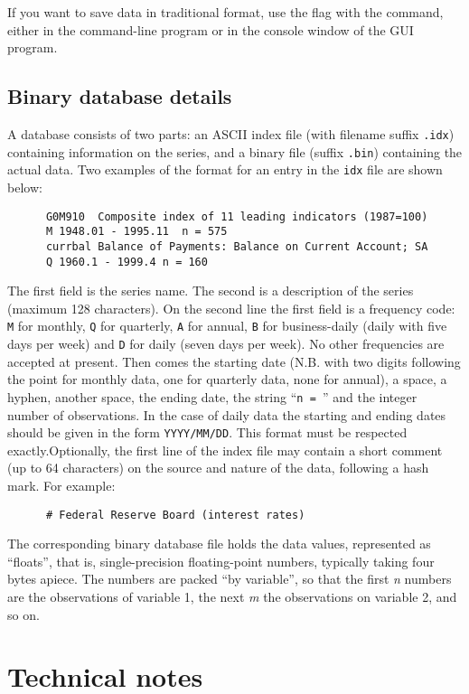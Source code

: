 If you want to save data in traditional format, use the  flag
with the  command, either in the command-line program or in
the console window of the GUI program.

\section{Binary database details}
\label{dbdetails}

A  database consists of two parts: an ASCII index file
(with filename suffix \verb+.idx+) containing information on the
series, and a binary file (suffix \verb+.bin+) containing the actual
data.  Two examples of the format for an entry in the \verb+idx+ file
are shown below:
\begin{verbatim}
      G0M910  Composite index of 11 leading indicators (1987=100) 
      M 1948.01 - 1995.11  n = 575
      currbal Balance of Payments: Balance on Current Account; SA 
      Q 1960.1 - 1999.4 n = 160
\end{verbatim}
The first field is the series name.  The second is a description of
the series (maximum 128 characters).  On the second line the first
field is a frequency code: \verb+M+ for monthly, \verb+Q+ for
quarterly, \verb+A+ for annual, \verb+B+ for business-daily (daily
with five days per week) and \verb+D+ for daily (seven days per week).
No other frequencies are accepted at present.  Then comes the starting
date (N.B. with two digits following the point for monthly data, one
for quarterly data, none for annual), a space, a hyphen, another
space, the ending date, the string ``\verb+n = +'' and the integer
number of observations. In the case of daily data the starting and
ending dates should be given in the form \verb+YYYY/MM/DD+. This
format must be respected exactly.Optionally, the first line of the
index file may contain a short comment (up to 64 characters) on the
source and nature of the data, following a hash mark.  For example:
\begin{verbatim}
      # Federal Reserve Board (interest rates)
\end{verbatim}
The corresponding binary database file holds the data values,
represented as ``floats'', that is, single-precision floating-point
numbers, typically taking four bytes apiece.  The numbers are packed
``by variable'', so that the first \emph{n} numbers are the
observations of variable 1, the next \emph{m} the observations on
variable 2, and so on.

\chapter{Technical notes}
\label{app-technote}

